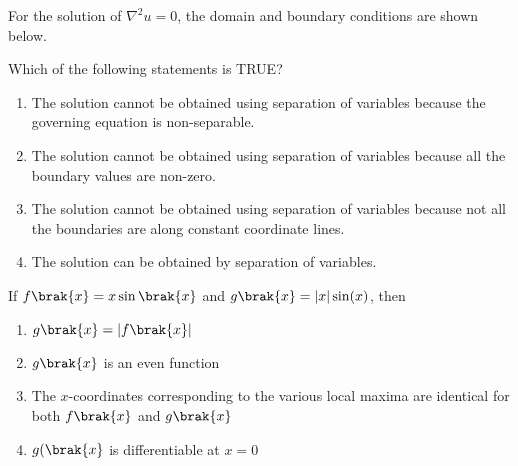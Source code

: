 	\item{
        	
        	For the solution of \(\nabla^2 u = 0\), the domain and boundary conditions are shown below.
        	\hfill
        	\begin{center}
        \end{center}
        	Which of the following statements is TRUE?
        	\begin{enumerate}
        		\item The solution cannot be obtained using separation of variables because the governing equation is non-separable.
        		\item The solution cannot be obtained using separation of variables because all the boundary values are non-zero.
        		\item The solution cannot be obtained using separation of variables because not all the boundaries are along constant coordinate lines.
        		\item The solution can be obtained by separation of variables.
        	\end{enumerate}
        	
      }
        \item {If \(f\brak{x} = x\sin\brak{x}\) and \(g\brak{x} = |x|\sin(x)\), then
        	
        	\begin{enumerate}
        		\item \(g\brak{x} = |f\brak{x}|\)
        		\item \(g\brak{x}\) is an even function
        		\item The \(x\)-coordinates corresponding to the various local maxima are identical for both \(f\brak{x}\) and \(g\brak{x}\)
        		\item \(g(\brak{x}\) is differentiable at \(x = 0\)
        	\end{enumerate}
  		}
    
